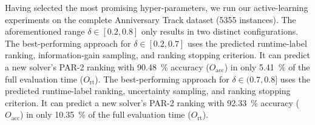 \documentclass[runningheads]{llncs}
\begin{document}
Having selected the most promising hyper-parameters, we run our active-learning experiments on the complete Anniversary Track dataset (5355 instances).
The aforementioned range $\delta \in \left[0.2, 0.8\right]$ only results in two distinct configurations.
The best-performing approach for $\delta \in \left[0.2, 0.7\right]$ uses the predicted runtime-label ranking, information-gain sampling, and ranking stopping criterion.
It can predict a new solver's PAR-2 ranking with \SI{90.48}{\%} accuracy ($O_{\operatorname{acc}}$) in only \SI{5.41}{\%} of the full evaluation time ($O_{\operatorname{rt}}$).
The best-performing approach for $\delta \in (0.7, 0.8]$ uses the predicted runtime-label ranking, uncertainty sampling, and ranking stopping criterion.
It can predict a new solver's PAR-2 ranking with \SI{92.33}{\%} accuracy ($O_{\operatorname{acc}}$) in only \SI{10.35}{\%} of the full evaluation time ($O_{\operatorname{rt}}$).
\end{document}
